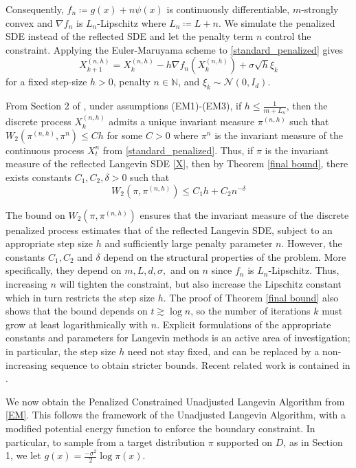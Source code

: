 \documentclass[amsfonts, reqno]{amsart}
\theoremstyle{definition}
\theoremstyle{remark}
\newcommand{\bbN}{\mathbb{N}}
\numberwithin{equation}{section}
\begin{document}
Consequently, $f_n \coloneqq g(x) + n\psi(x)$ is continuously differentiable, $m$-strongly convex and $\nabla f_n$ is $L_n$-Lipschitz where $L_n \coloneqq L + n.$ We simulate the penalized SDE instead of the reflected SDE and let the penalty term $n$ control the constraint. Applying the Euler-Maruyama scheme to \eqref{standard_penalized} gives \begin{equation}\label{EM}
    X_{k+1}^{(n,h)} = X_k^{(n,h)} - h\nabla f_n(X_k^{(n,h)}) + \sigma\sqrt{h}\xi_k
\end{equation}
for a fixed step-size $h > 0$, penalty $n \in \bbN$, and $\xi_k \sim \mathcal{N}(0, I_d)$.

From Section 2 of \cite{Moulines2019}, under assumptions (EM1)-(EM3), if $h \leq \frac{1}{m + L_n}$, then the discrete process $X_k^{(n,h)}$ admits a unique invariant measure $\pi^{(n,h)}$ such that $W_2(\pi^{(n,h)}, \pi^n) \leq Ch$ for some $C > 0$ where $\pi^n$ is the invariant measure of the continuous process $X_t^n$ from \eqref{standard_penalized}. Thus, if $\pi$ is the invariant measure of the reflected Langevin SDE \eqref{X}, then by Theorem \ref{final bound}, there exists constants $C_1, C_2, \delta > 0$ such that
\begin{equation}
    W_2\left(\pi, \pi^{(n,h)}\right) \leq C_1h + C_2n^{-\delta}
\end{equation} 

The bound on $W_2\left(\pi, \pi^{(n,h)}\right)$ ensures that the invariant measure of the discrete penalized process estimates that of the reflected Langevin SDE, subject to an appropriate step size $h$ and sufficiently large penalty parameter $n$. However, the constants $C_1, C_2$ and $\delta$ depend on the structural properties of the problem. More specifically, they depend on $m, L, d, \sigma,$ and on $n$ since $f_n$ is $L_n$-Lipschitz. Thus, increasing $n$ will tighten the constraint, but also increase the Lipschitz constant which in turn restricts the step size $h$. The proof of Theorem \ref{final bound} also shows that the bound depends on $t \gtrsim \log n$, so the number of iterations $k$ must grow at least logarithmically with $n$. Explicit formulations of the appropriate constants and parameters for Langevin methods is an active area of investigation; in particular, the step size $h$ need not stay fixed, and can be replaced by a non-increasing sequence to obtain stricter bounds. Recent related work is contained in \cites{Durmus2019, Eberle2019, Moulines2019}.

We now obtain the Penalized Constrained Unadjusted Langevin Algorithm from \eqref{EM}. This follows the framework of the Unadjusted Langevin Algorithm, with a modified potential energy function to enforce the boundary constraint. In particular, to sample from a target distribution $\pi$ supported on $D$, as in Section 1, we let $g(x) = \frac{-\sigma^2}{2}\log \pi(x).$
\end{document}
